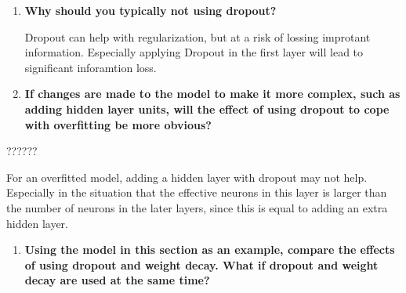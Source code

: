 \documentclass[11pt]{article}
\providecommand{\tightlist}{%
      \setlength{\itemsep}{0pt}\setlength{\parskip}{0pt}}
\begin{document}
    \begin{enumerate}
\def\labelenumi{\arabic{enumi}.}
\setcounter{enumi}{3}
\item
  \textbf{Why should you typically not using dropout?}

  Dropout can help with regularization, but at a risk of lossing
  improtant information. Especially applying Dropout in the first layer
  will lead to significant inforamtion loss.
\item
  \textbf{If changes are made to the model to make it more complex, such
  as adding hidden layer units, will the effect of using dropout to cope
  with overfitting be more obvious?}
\end{enumerate}

??????

For an overfitted model, adding a hidden layer with dropout may not
help. Especially in the situation that the effective neurons in this
layer is larger than the number of neurons in the later layers, since
this is equal to adding an extra hidden layer.

\begin{enumerate}
\def\labelenumi{\arabic{enumi}.}
\setcounter{enumi}{5}
\tightlist
\item
  \textbf{Using the model in this section as an example, compare the
  effects of using dropout and weight decay. What if dropout and weight
  decay are used at the same time?}
\end{enumerate}
\end{document}
